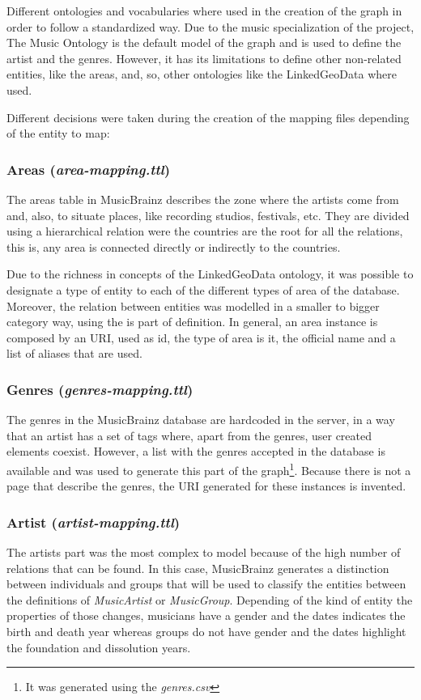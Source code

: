 Different ontologies and vocabularies where used in the creation of the graph in order to follow a standardized way.
Due to the music specialization of the project, The Music Ontology \citep{music_ontology} is the default model of the graph and is used to define the artist and the genres.
However, it has its limitations to define other non-related entities, like the areas, and, so, other ontologies like the LinkedGeoData \citep{linkedgeodata} where used. 

Different decisions were taken during the creation of the mapping files depending of the entity to map:

\subsubsection{Areas (\textit{area-mapping.ttl})}
The areas table in MusicBrainz describes the zone where the artists come from and, also, to situate places, like recording studios, festivals, etc.
They are divided using a hierarchical relation were the countries are the root for all the relations, this is, any area is connected directly or indirectly to the countries.  

Due to the richness in concepts of the LinkedGeoData ontology, it was possible to designate a type of entity to each of the different types of area of the database.
Moreover, the relation between entities was modelled in a smaller to bigger category way, using the is part of definition.
In general, an area instance is composed by an URI, used as id, the type of area is it, the official name and a list of aliases that are used. 

\subsubsection{Genres (\textit{genres-mapping.ttl})}
The genres in the MusicBrainz database are hardcoded in the server, in a way that an artist has a set of tags where, apart from the genres, user created elements coexist.
However, a list with the genres accepted in the database is available and was used to generate this part of the graph\footnote{It was generated using the \textit{genres.csv}}.
Because there is not a page that describe the genres, the URI generated for these instances is invented. 

\subsubsection{Artist (\textit{artist-mapping.ttl})}
The artists part was the most complex to model because of the high number of relations that can be found. In this case, MusicBrainz generates a distinction between individuals and groups that will be used to classify the entities between the definitions of \textit{MusicArtist} or \textit{MusicGroup}. Depending of the kind of entity the properties of those changes, musicians have a gender and the dates indicates the birth and death year whereas groups do not have gender and the dates highlight the foundation and dissolution years. 

